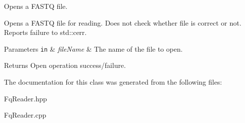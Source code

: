 Opens a F\-A\-S\-T\-Q file. 

Opens a F\-A\-S\-T\-Q file for reading. Does not check whether file is correct or not. Reports failure to std\-::cerr. 
\begin{DoxyParams}[1]{Parameters}
\mbox{\tt in}  & {\em file\-Name} & The name of the file to open. \\
\hline
\end{DoxyParams}
\begin{DoxyReturn}{Returns}
Open operation success/failure. 
\end{DoxyReturn}


The documentation for this class was generated from the following files\-:\begin{DoxyCompactItemize}
\item 
Fq\-Reader.\-hpp\item 
Fq\-Reader.\-cpp\end{DoxyCompactItemize}
